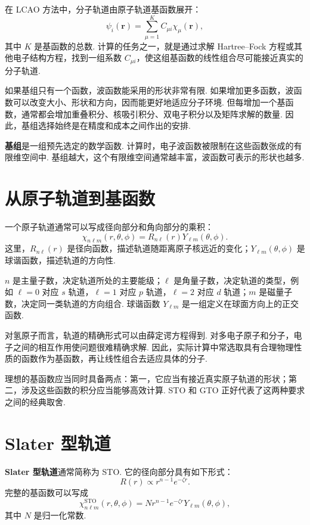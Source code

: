 \documentclass[UTF8,11pt,a4paper,openany]{ctexbook}
\newcommand{\term}[1]{\textbf{#1}}
\begin{document}
在 LCAO 方法中，分子轨道由原子轨道基函数展开：
\[
\psi_i(\mathbf r)=\sum_{\mu=1}^{K}C_{\mu i}\chi_\mu(\mathbf r),
\]
其中 $K$ 是基函数的总数. 计算的任务之一，就是通过求解 Hartree--Fock 方程或其他电子结构方程，找到一组系数 $C_{\mu i}$，使这组基函数的线性组合尽可能接近真实的分子轨道. 

如果基组只有一个函数，波函数能采用的形状非常有限. 如果增加更多函数，波函数可以改变大小、形状和方向，因而能更好地适应分子环境. 但每增加一个基函数，通常都会增加重叠积分、核吸引积分、双电子积分以及矩阵求解的数量. 因此，基组选择始终是在精度和成本之间作出的安排. 

\begin{definitionbox}
\term{基组}是一组预先选定的数学函数. 计算时，电子波函数被限制在这些函数张成的有限维空间中. 基组越大，这个有限维空间通常越丰富，波函数可表示的形状也越多. 
\end{definitionbox}

\section{从原子轨道到基函数}

一个原子轨道通常可以写成径向部分和角向部分的乘积：
\[
\chi_{n\ell m}(r,\theta,\phi)=R_{n\ell}(r)Y_{\ell m}(\theta,\phi).
\]
这里，$R_{n\ell}(r)$ 是径向函数，描述轨道随距离原子核远近的变化；$Y_{\ell m}(\theta,\phi)$ 是球谐函数，描述轨道的方向性. 

\begin{notationbox}
$n$ 是主量子数，决定轨道所处的主要能级；$\ell$ 是角量子数，决定轨道的类型，例如 $\ell=0$ 对应 $s$ 轨道，$\ell=1$ 对应 $p$ 轨道，$\ell=2$ 对应 $d$ 轨道；$m$ 是磁量子数，决定同一类轨道的方向组合. 球谐函数 $Y_{\ell m}$ 是一组定义在球面方向上的正交函数. 
\end{notationbox}

对氢原子而言，轨道的精确形式可以由薛定谔方程得到. 对多电子原子和分子，电子之间的相互作用使问题很难精确求解. 因此，实际计算中常选取具有合理物理性质的函数作为基函数，再让线性组合去适应具体的分子. 

理想的基函数应当同时具备两点：第一，它应当有接近真实原子轨道的形状；第二，涉及这些函数的积分应当能够高效计算. STO 和 GTO 正好代表了这两种要求之间的经典取舍. 

\section{Slater 型轨道}

\term{Slater 型轨道}通常简称为 STO. 它的径向部分具有如下形式：
\[
R(r)\propto r^{n-1}e^{-\zeta r}.
\]
完整的基函数可以写成
\[
\chi_{n\ell m}^{\mathrm{STO}}(r,\theta,\phi)
=
N r^{n-1}e^{-\zeta r}Y_{\ell m}(\theta,\phi),
\]
其中 $N$ 是归一化常数. 
\end{document}
